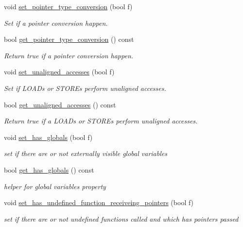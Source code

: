 \begin{DoxyCompactItemize}
void \hyperlink{classFunctionBehavior_af013fcbd63fa813988b860f382ab1857}{set\+\_\+pointer\+\_\+type\+\_\+conversion} (bool f)
\begin{DoxyCompactList}\small\item\em Set if a pointer conversion happen. \end{DoxyCompactList}\item 
bool \hyperlink{classFunctionBehavior_a4fc3689f912d7f75f7c1340b8338249b}{get\+\_\+pointer\+\_\+type\+\_\+conversion} () const
\begin{DoxyCompactList}\small\item\em Return true if a pointer conversion happen. \end{DoxyCompactList}\item 
void \hyperlink{classFunctionBehavior_a50213465442e3966f63833417666d57a}{set\+\_\+unaligned\+\_\+accesses} (bool f)
\begin{DoxyCompactList}\small\item\em Set if L\+O\+A\+Ds or S\+T\+O\+R\+Es perform unaligned accesses. \end{DoxyCompactList}\item 
bool \hyperlink{classFunctionBehavior_a2083d4c4fbab19a2fa33565cf9fd1486}{get\+\_\+unaligned\+\_\+accesses} () const
\begin{DoxyCompactList}\small\item\em Return true if a L\+O\+A\+Ds or S\+T\+O\+R\+Es perform unaligned accesses. \end{DoxyCompactList}\item 
void \hyperlink{classFunctionBehavior_aea7648ee83cb16c05995ff50bf9fc2d0}{set\+\_\+has\+\_\+globals} (bool f)
\begin{DoxyCompactList}\small\item\em set if there are or not externally visible global variables \end{DoxyCompactList}\item 
bool \hyperlink{classFunctionBehavior_a76ce9c2966c256c2a0fb4930a7dd2f4a}{get\+\_\+has\+\_\+globals} () const
\begin{DoxyCompactList}\small\item\em helper for global variables property \end{DoxyCompactList}\item 
void \hyperlink{classFunctionBehavior_a87418281b2b236a5ea1a713c69562d3e}{set\+\_\+has\+\_\+undefined\+\_\+function\+\_\+receiveing\+\_\+pointers} (bool f)
\begin{DoxyCompactList}\small\item\em set if there are or not undefined functions called and which has pointers passed \end{DoxyCompactList}\item 

\end{DoxyCompactItemize}
